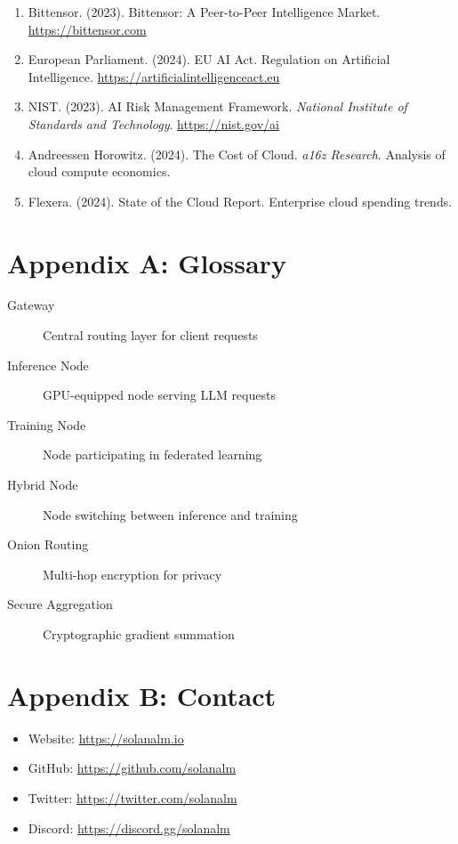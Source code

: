 \documentclass[11pt,a4paper]{article}
\begin{document}
\begin{enumerate}
    \item Bittensor. (2023). Bittensor: A Peer-to-Peer Intelligence Market. \url{https://bittensor.com}

    \item European Parliament. (2024). EU AI Act. Regulation on Artificial Intelligence. \url{https://artificialintelligenceact.eu}

    \item NIST. (2023). AI Risk Management Framework. \textit{National Institute of Standards and Technology}. \url{https://nist.gov/ai}

    \item Andreessen Horowitz. (2024). The Cost of Cloud. \textit{a16z Research}. Analysis of cloud compute economics.

    \item Flexera. (2024). State of the Cloud Report. Enterprise cloud spending trends.
\end{enumerate}

\section*{Appendix A: Glossary}

\begin{description}
    \item[Gateway] Central routing layer for client requests
    \item[Inference Node] GPU-equipped node serving LLM requests
    \item[Training Node] Node participating in federated learning
    \item[Hybrid Node] Node switching between inference and training
    \item[Onion Routing] Multi-hop encryption for privacy
    \item[Secure Aggregation] Cryptographic gradient summation
\end{description}

\section*{Appendix B: Contact}

\begin{itemize}
    \item Website: \url{https://solanalm.io}
    \item GitHub: \url{https://github.com/solanalm}
    \item Twitter: \url{https://twitter.com/solanalm}
    \item Discord: \url{https://discord.gg/solanalm}
\end{itemize}
\end{document}
